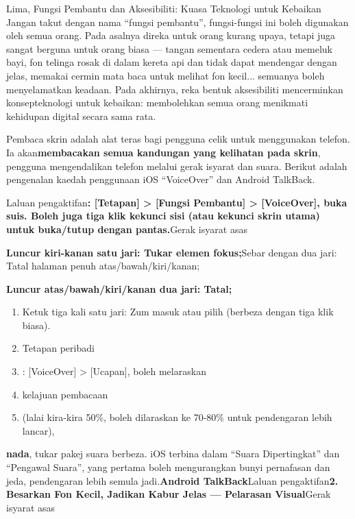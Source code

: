 \begin{tcbinfo}{Lima, Fungsi Pembantu dan Aksesibiliti: Kuasa Teknologi untuk Kebaikan}
Jangan takut dengan nama “fungsi pembantu”, fungsi-fungsi ini boleh digunakan oleh semua orang. Pada asalnya direka untuk orang kurang upaya, tetapi juga sangat berguna untuk orang biasa — tangan sementara cedera atau memeluk bayi, fon telinga rosak di dalam kereta api dan tidak dapat mendengar dengan jelas, memakai cermin mata baca untuk melihat fon kecil... semuanya boleh menyelamatkan keadaan. Pada akhirnya, reka bentuk aksesibiliti mencerminkan konsep\newline teknologi untuk kebaikan\newline : membolehkan semua orang menikmati kehidupan digital secara sama rata.

\end{tcbinfo}


Pembaca skrin adalah alat teras bagi pengguna celik untuk menggunakan telefon. Ia akan\textbf{membacakan semua kandungan yang kelihatan pada skrin}, pengguna mengendalikan telefon melalui gerak isyarat dan suara. Berikut adalah pengenalan kaedah penggunaan iOS “VoiceOver” dan Android TalkBack.


Laluan pengaktifan\textbf{: [Tetapan] > [Fungsi Pembantu] > [VoiceOver], buka suis. Boleh juga tiga klik kekunci sisi (atau kekunci skrin utama) untuk buka/tutup dengan pantas.}Gerak isyarat asas

\begin{tcbinfo}{}
\textbf{Luncur kiri-kanan satu jari: Tukar elemen fokus;}Sebar dengan dua jari: Tatal halaman penuh atas/bawah/kiri/kanan;

\textbf{Luncur atas/bawah/kiri/kanan dua jari: Tatal;}

\begin{enumerate}
  \item Ketuk tiga kali satu jari: Zum masuk atau pilih (berbeza dengan tiga klik biasa).
  \item Tetapan peribadi
  \item : [VoiceOver] > [Ucapan], boleh melaraskan
  \item kelajuan pembacaan
  \item (lalai kira-kira 50\%, boleh dilaraskan ke 70-80\% untuk pendengaran lebih lancar),
\end{enumerate}

\textbf{nada}, tukar pakej suara berbeza. iOS terbina dalam “Suara Dipertingkat” dan “Pengawal Suara”, yang pertama boleh mengurangkan bunyi pernafasan dan jeda, pendengaran lebih semula jadi.\textbf{Android TalkBack}Laluan pengaktifan\textbf{2. Besarkan Fon Kecil, Jadikan Kabur Jelas — Pelarasan Visual}Gerak isyarat asas

\end{tcbinfo}

